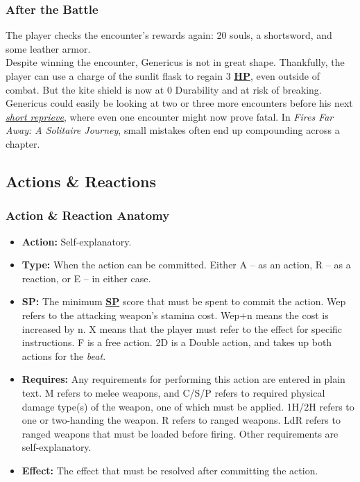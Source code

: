 \documentclass[12pt]{article}
\newcommand{\refto}[1]{\hyperlink{#1}{\textbf{#1}}}
\newcommand{\reftoit}[1]{\hyperlink{#1}{\emph{#1}}}
\begin{document}
\begin{multicols*}{2}
\subsubsection*{After the Battle}
The player checks the encounter’s rewards again: 20 souls, a shortsword, and some leather armor.\\
Despite winning the encounter, Genericus is not in great shape. Thankfully, the player can use a charge of the sunlit flask to regain 3 \refto{HP}, even outside of combat. But the kite shield is now at 0 Durability and at risk of breaking. Genericus could easily be looking at two or three more encounters before his next \reftoit{short reprieve}, where even one encounter might now prove fatal. In \emph{Fires Far Away: A Solitaire Journey}, small mistakes often end up compounding across a chapter.
\end{multicols*}

\pagebreak

\subsection{Actions \& Reactions}
\subsubsection*{Action \& Reaction Anatomy}
\begin{itemize}
\item \textbf{Action:} Self-explanatory.
\item \textbf{Type:} When the action can be committed. Either A – as an action, R – as a reaction, or E – in either case.
\item\textbf{SP:} The minimum \refto{SP} score that must be spent to commit the action. Wep refers to the attacking weapon’s stamina cost. Wep+n means the cost is increased by n. X means that the player must refer to the effect for specific instructions. F is a free action. 2D is a Double action, and takes up both actions for the \emph{beat}.
\item \textbf{Requires:} Any requirements for performing this action are entered in plain text. M refers to melee weapons, and C/S/P refers to required physical damage type(s) of the weapon, one of which must be applied. 1H/2H refers to one or two-handing the weapon. R refers to ranged weapons. LdR refers to ranged weapons that must be loaded before firing. Other requirements are self-explanatory. 
\item \textbf{Effect:} The effect that must be resolved after committing the action.
\end{itemize}
\end{document}
